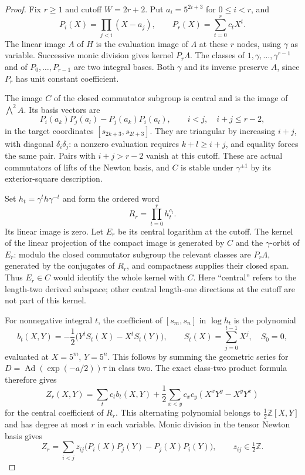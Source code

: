 \begin{proof}
Fix $r\geq1$ and cutoff $W=2r+2$. Put $a_i=5^{2i+3}$ for
$0\leq i<r$, and
\[
 P_i(X)=\prod_{j<i}(X-a_j),\qquad
 P_r(X)=\sum_{t=0}^r c_tX^t.
\]
The linear image $A$ of $H$ is the evaluation image of
$\Lambda$ at these $r$ nodes, using $\gamma$ as variable.
Successive monic division gives kernel $P_r\Lambda$.
The classes of $1,\gamma,\ldots,\gamma^{r-1}$ and of
$P_0,\ldots,P_{r-1}$ are two integral bases. Both $\gamma$
and its inverse preserve $A$, since $P_r$ has unit constant
coefficient.

The image $C$ of the closed commutator subgroup is central
and is the image of $\bigwedge^2 A$. Its basis vectors are
\[
 P_i(a_k)P_j(a_l)-P_j(a_k)P_i(a_l),\qquad
       i<j,\quad i+j\leq r-2,
\]
in the target coordinates $[s_{2k+3},s_{2l+3}]$.
They are triangular by increasing $i+j$, with diagonal
$\delta_i\delta_j$: a nonzero evaluation requires
$k+l\geq i+j$, and equality forces the same pair.
Pairs with $i+j>r-2$ vanish at this cutoff. These are actual
commutators of lifts of the Newton basis, and $C$ is stable
under $\gamma^{\pm1}$ by its exterior-square description.

Set $h_t=\gamma^t h\gamma^{-t}$ and form the ordered word
\[
 R_r=\prod_{t=0}^r h_t^{c_t}.
\]
Its linear image is zero. Let $E_r$ be its central logarithm
at the cutoff. The kernel of the linear projection of the
compact image is generated by $C$ and the $\gamma$-orbit of
$E_r$: modulo the closed commutator subgroup the relevant
classes are $P_r\Lambda$, generated by the conjugates of
$R_r$, and compactness supplies their closed span. Thus
$E_r\in C$ would identify the whole kernel with $C$.
Here ``central'' refers to the length-two derived subspace;
other central length-one directions at the cutoff are not
part of this kernel.

For nonnegative integral $t$, the coefficient of
$[s_m,s_n]$ in $\log h_t$ is the polynomial
\[
 b_t(X,Y)=-\frac12\bigl(Y^t S_t(X)-X^tS_t(Y)\bigr),
 \qquad S_t(X)=\sum_{j=0}^{t-1}X^j,\quad S_0=0,
\]
evaluated at $X=5^m$, $Y=5^n$. This follows by summing the
geometric series for
$D=\operatorname{Ad}(\exp(-a/2))\tau$ in class two.
The exact class-two product formula therefore gives
\[
 Z_r(X,Y)=\sum_t c_tb_t(X,Y)
 +\frac12\sum_{x<y}c_xc_y(X^xY^y-X^yY^x)               \tag{C2.1}
\]
for the central coefficient of $R_r$. This alternating
polynomial belongs to $\tfrac12\mathbb Z[X,Y]$ and has degree
at most $r$ in each variable. Monic division in the tensor
Newton basis gives
\[
 Z_r=\sum_{i<j}z_{ij}
       \bigl(P_i(X)P_j(Y)-P_j(X)P_i(Y)\bigr),
       \qquad z_{ij}\in\tfrac12\mathbb Z.             \tag{C2.2}
\]


\end{proof}
